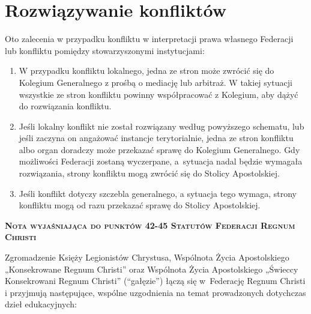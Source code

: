 \chapter{Rozwiązywanie konfliktów}




 Oto zalecenia w przypadku konfliktu w interpretacji prawa własnego Federacji lub konfliktu pomiędzy stowarzyszonymi instytucjami:


\begin{enumerate}


\item W przypadku konfliktu lokalnego, jedna ze stron może zwrócić się do Kolegium Generalnego z prośbą o mediację lub arbitraż. W takiej sytuacji wszystkie ze stron konfliktu powinny współpracować z Kolegium, aby dążyć do rozwiązania konfliktu.


\item Jeśli lokalny konflikt nie został rozwiązany według powyższego schematu, lub jeśli zaczyna on angażować instancje terytorialnie, jedna ze stron konfliktu albo organ doradczy może przekazać sprawę do Kolegium Generalnego. Gdy możliwości Federacji zostaną wyczerpane, \mbox{a sytuacja} nadal będzie wymagała rozwiązania, strony konfliktu mogą zwrócić się do Stolicy Apostolskiej.


\item Jeśli konflikt dotyczy szczebla generalnego, a sytuacja tego wymaga, strony konfliktu mogą od razu przekazać sprawę do Stolicy Apostolskiej.


\end{enumerate}
 
 


\newpage
{}
{\large\bf\textsc{Nota wyjaśniająca do punktów 42-45 Statutów Federacji Regnum Christi}}
 
Zgromadzenie Księży Legionistów Chrystusa, Wspólnota Życia Apostolskiego „Konsekrowane Regnum Christi” oraz Wspólnota Życia Apostolskiego „Świeccy Konsekrowani Regnum Christi” (“gałęzie”) łączą się \mbox{w Federację} Regnum Christi i przyjmują następujące, wspólne uzgodnienia na temat prowadzonych dotychczas dzieł edukacyjnych:


